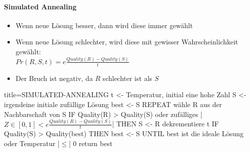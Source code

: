 \documentclass[
    ngerman,
    color=3b,
    load_common, %
    summary,
    boxarc,
]{rubos-tuda-template}
\begin{document}
\clearpage

\paragraph{Simulated Annealing}\mbox{}
\begin{idea}\mbox{}
    \begin{itemize}
        \item Wenn neue Lösung besser, dann wird diese immer gewählt
        \item Wenn neue Lösung schlechter, wird diese mit gewisser Wahrscheinlichkeit gewählt: \\
              $Pr(R,S,t) = e \frac{Quality(R)-Quality(S)}{t}$
        \item Der Bruch ist negativ, da $R$ schlechter ist als $S$
    \end{itemize}
\end{idea}
\begin{codeBlock}[autogobble,escapeinside=||]{title={SIMULATED-ANNEALING}}
    t <- Temperatur, initial eine hohe Zahl
    S <- irgendeine initiale zufällige Lösung
    best <- S
    REPEAT
        wähle R aus der Nachbarschaft von S
        IF Quality(R) > Quality(S) oder zufälliges
                    |$ Z \in [0,1] < e \frac{Quality(R)-Quality(S)}{t}$| THEN
                S <- R
        dekrementiere t
        IF Quality(S) > Quality(best) THEN
            best <- S 
    UNTIL best ist die ideale Lösung oder Temperatur |$\leq$| 0
    return best
\end{codeBlock}
\vspace{-1em}
\end{document}
